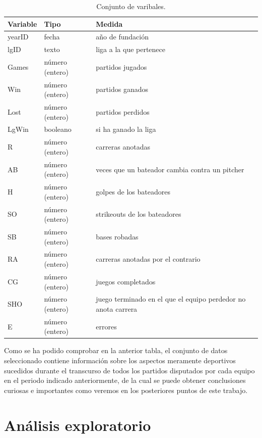 \documentclass[10pt]{article}
\begin{document}
\begin{table}[htbp]
\begin{center}
\begin{tabular}{|l|l||l|}
\hline
Variable & Tipo  & Medida \\
\hline \hline \hline
yearID & fecha  & año de fundación \\ \hline
lgID & texto  & liga a la que pertenece \\ \hline
Games & número (entero) & partidos jugados \\ \hline
Win & número (entero) & partidos ganados \\ \hline
Lost & número (entero) & partidos perdidos \\ \hline
LgWin & booleano & si ha ganado la liga \\ \hline
R & número (entero) & carreras anotadas \\ \hline
AB & número (entero) & veces que un bateador cambia contra un pitcher \\ \hline
H & número (entero) & golpes de los bateadores \\ \hline
SO & número (entero) & strikeouts de los bateadores \\ \hline
SB & número (entero) & bases robadas \\ \hline
RA & número (entero) & carreras anotadas por el contrario \\ \hline
CG & número (entero) & juegos completados \\ \hline
SHO & número (entero) & juego terminado en el que el equipo perdedor no anota carrera \\ \hline
E & número (entero) & errores \\ \hline
\end{tabular}
\caption{Conjunto de varibales.}
\label{Tabla:}
\end{center}
\end{table}

Como se ha podido comprobar en la anterior tabla, el conjunto de datos seleccionado contiene información sobre los aspectos meramente deportivos sucedidos durante el transcurso de todos los partidos disputados por cada equipo en el periodo indicado anteriormente, de la cual se puede obtener conclusiones curiosas e importantes como veremos en los posteriores puntos de este trabajo.

	

\section{Análisis exploratorio}
\end{document}
